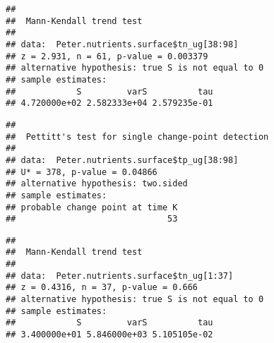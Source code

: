 \documentclass[]{article}
\newenvironment{Shaded}{\begin{snugshade}}{\end{snugshade}}
\newcommand{\KeywordTok}[1]{\textcolor[rgb]{0.13,0.29,0.53}{\textbf{#1}}}
\newcommand{\DecValTok}[1]{\textcolor[rgb]{0.00,0.00,0.81}{#1}}
\newcommand{\CommentTok}[1]{\textcolor[rgb]{0.56,0.35,0.01}{\textit{#1}}}
\newcommand{\OperatorTok}[1]{\textcolor[rgb]{0.81,0.36,0.00}{\textbf{#1}}}
\newcommand{\NormalTok}[1]{#1}
\begin{document}
\begin{Shaded}
\end{Shaded}

\begin{verbatim}
## 
##  Mann-Kendall trend test
## 
## data:  Peter.nutrients.surface$tn_ug[38:98]
## z = 2.931, n = 61, p-value = 0.003379
## alternative hypothesis: true S is not equal to 0
## sample estimates:
##            S         varS          tau 
## 4.720000e+02 2.582333e+04 2.579235e-01
\end{verbatim}

\begin{Shaded}
\end{Shaded}

\begin{verbatim}
## 
##  Pettitt's test for single change-point detection
## 
## data:  Peter.nutrients.surface$tp_ug[38:98]
## U* = 378, p-value = 0.04866
## alternative hypothesis: two.sided
## sample estimates:
## probable change point at time K 
##                              53
\end{verbatim}

\begin{Shaded}
\end{Shaded}

\begin{verbatim}
## 
##  Mann-Kendall trend test
## 
## data:  Peter.nutrients.surface$tn_ug[1:37]
## z = 0.4316, n = 37, p-value = 0.666
## alternative hypothesis: true S is not equal to 0
## sample estimates:
##            S         varS          tau 
## 3.400000e+01 5.846000e+03 5.105105e-02
\end{verbatim}
\end{document}
